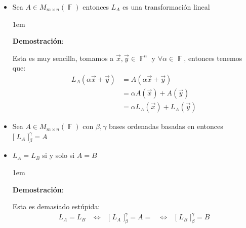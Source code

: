 \documentclass[12pt, fleqn]{report}                             %
\newenvironment{SmallIndentation}[1][0.75em]                    %
        {\begin{adjustwidth}{#1}{}\begin{footnotesize}}             %
        {\end{footnotesize}\end{adjustwidth}}                       %
\DeclareMathOperator \Space {\quad}                             %
\DeclareMathOperator \MiniSpace {\;}                            %
\theoremstyle{break}                                            %
\newcommand \lEqual  {\MiniSpace \Leftrightarrow \MiniSpace}    %
\DeclareMathOperator \GenericField {\mathbb{F}}                 %
\newcommand{\BigBrackets}[1] {\Big[ \; #1 \; \Big]}             %
\begin{document}
                \begin{itemize}
                    
                    \item 
                        Sea $A \in M_{m \times n}(\GenericField)$ entonces $L_A$
                        es una transformación lineal

                        \begin{SmallIndentation}[1em]
                            \textbf{Demostración}:
                            
                            Esta es muy sencilla, tomamos a $\vec x, \vec y \in \GenericField^n$
                            y $\forall \alpha \in \GenericField$, entonces tenemos que:
                            \begin{align*}
                                L_A(\alpha \vec x + \vec y)
                                    &= A(\alpha \vec x + \vec y)        \\
                                    &= \alpha A(\vec x) + A(\vec y)     \\
                                    &= \alpha L_A(\vec x) + L_A(\vec y)
                            \end{align*}
                        
                        \end{SmallIndentation}
                            

                    \item
                        Sea $A \in M_{m \times n}(\GenericField)$ con $\beta, \gamma$
                        bases ordenadas basadas en  entonces 
                        $\BigBrackets{L_A}_\beta^\gamma = A$

                    \item
                        $L_A = L_B$ si y solo si $A = B$

                        \begin{SmallIndentation}[1em]
                            \textbf{Demostración}:
                            
                            Esta es demasiado estúpida:
                            \begin{align*}
                                L_A = L_B
                                \lEqual \BigBrackets{L_A}_\beta^\gamma 
                                = A =
                                \lEqual \BigBrackets{L_B}_\beta^\gamma 
                                = B
                            \end{align*}
                        

\end{SmallIndentation}
\end{itemize}
\end{document}
